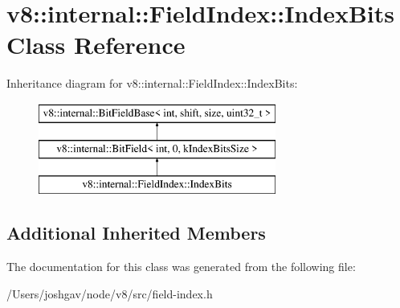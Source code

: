 \hypertarget{classv8_1_1internal_1_1_field_index_1_1_index_bits}{}\section{v8\+:\+:internal\+:\+:Field\+Index\+:\+:Index\+Bits Class Reference}
\label{classv8_1_1internal_1_1_field_index_1_1_index_bits}
Inheritance diagram for v8\+:\+:internal\+:\+:Field\+Index\+:\+:Index\+Bits\+:\begin{figure}[H]
\begin{center}
\leavevmode
\includegraphics[height=3.000000cm]{classv8_1_1internal_1_1_field_index_1_1_index_bits}
\end{center}
\end{figure}
\subsection*{Additional Inherited Members}


The documentation for this class was generated from the following file\+:\begin{DoxyCompactItemize}
\item 
/\+Users/joshgav/node/v8/src/field-\/index.\+h\end{DoxyCompactItemize}
